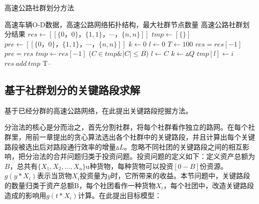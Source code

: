 				\begin{algorithm}[h]
		        \caption{高速公路社群划分方法}  
		        \label{shequn}
		        \begin{algorithmic}[1] %
		            \Require 高速车辆O-D数据，高速公路网络拓扑结构，最大社群节点数量
		            \Ensure 高速公路社群划分结果
		                \State $res\gets [[\{0，0\}，\{1,1\}，\cdots，\{n,n\}]]$ 
		                \State $tmp\gets [\{\}]$
		                \State $pre\gets [[\{0，0\}，\{1,1\}，\cdots，\{n,n\}]]$ 
		                \State $k\gets 0$  
		                \State $l\gets 0$
		                \State $T\gets 100$  
		                	\State $res=res[-1]$
		                	\State $pre=res$
			                	\State $tmp\gets res[-1]$  
			                		\For($C \in tmp \& |C| \le B$)
				                        	\State $l\gets C$  
				                        	\State $k\gets {\vartriangle Q}$  
			                    		\EndIf	
			                		\EndFor
			                    	\State $tmp[l] \gets i$ 
			                	\EndFor
			                	\State $res \ add \ tmp$
		                	\EndWhile
		                	\State T--
		                \EndWhile  
		                \State {}  
		            \EndFunction  
		        \end{algorithmic}  
		    	\end{algorithm} 

		\subsection{基于社群划分的关键路段求解}
				基于已经分群的高速公路网络，在此提出关键路段挖掘方法。

				分治法的核心是分而治之，首先分割社群，将每个社群看作独立的路网。在每个社群里，用前一章提出的贪心算法选出各个社群中的关键路段，并且计算出每个关键路段被选出后对路段通行效率的增量$\vartriangle L$。忽略不同社团的关键路段之间的相互影响，把分治法的合并问题归类于投资问题。投资问题的定义如下：定义资产总额为$B$，总共有$\{X_1,X_2,\dots,X_u\}$u种货物，每种货物可以投资$[0-B]$份资源。$g(y*X_{i})$表示当货物$X_i$投资量为$y$时，它所带来的收益。本节问题中，关键路段的数量归类于资产总额B，每个社团看作一种货物$X_i$，每个社团中，改造关键路段造成的影响用$g(t*X_{i})$计算。在此提出目标模型：

